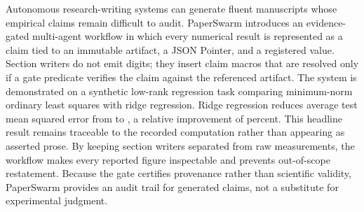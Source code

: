 Autonomous research-writing systems can generate fluent manuscripts whose empirical claims remain difficult to audit. PaperSwarm introduces an evidence-gated multi-agent workflow in which every numerical result is represented as a claim tied to an immutable artifact, a JSON Pointer, and a registered value. Section writers do not emit digits; they insert claim macros that are resolved only if a gate predicate verifies the claim against the referenced artifact. The system is demonstrated on a synthetic low-rank regression task comparing minimum-norm ordinary least squares with ridge regression. Ridge regression reduces average test mean squared error from  to , a relative improvement of  percent. This headline result remains traceable to the recorded computation rather than appearing as asserted prose. By keeping section writers separated from raw measurements, the workflow makes every reported figure inspectable and prevents out-of-scope restatement. Because the gate certifies provenance rather than scientific validity, PaperSwarm provides an audit trail for generated claims, not a substitute for experimental judgment.
